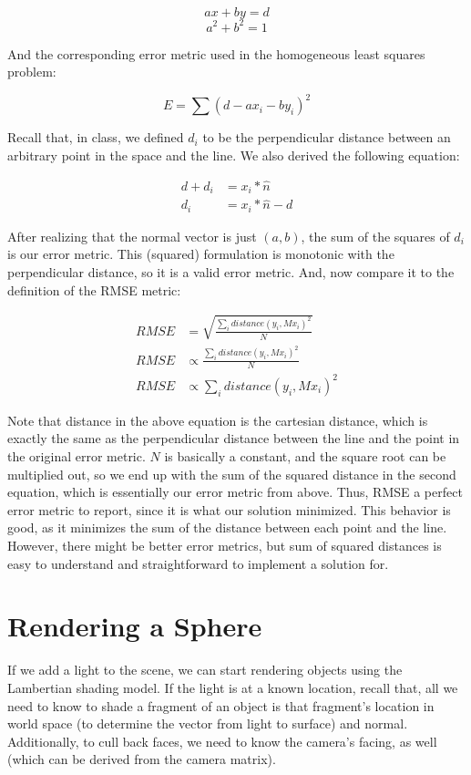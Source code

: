 \documentclass{article}
\begin{document}
$$
a x + b y = d
$$
$$
a^2 + b^2 = 1
$$
 
And the corresponding error metric used in the homogeneous least squares problem:

$$
E = \sum (d - a x_i - b y_i)^2
$$

Recall that, in class, we defined $d_i$ to be the perpendicular distance between 
an arbitrary point in the space and the line. We also derived the following equation: 

\begin{align}
d + d_i &= x_i * \hat{n} \\
d_i &= x_i * \hat{n} - d
\end{align}

After realizing that the normal vector is just $(a, b)$, the sum of the squares 
of $d_i$ is our error metric. This (squared) formulation is monotonic with the 
perpendicular distance, so it is a valid error metric. And, now compare it to 
the definition of the RMSE metric:

\begin{align}
RMSE &= \sqrt{\frac{\sum_i distance(y_i, M x_i)^2}{N}} \\
RMSE &\propto \frac{\sum_i distance(y_i, M x_i)^2}{N} \\
RMSE &\propto \sum_i distance(y_i, M x_i)^2
\end{align}

Note that distance in the above equation is the cartesian distance, which is 
exactly the same as the perpendicular distance between the line and the point 
in the original error metric. $N$ is basically a constant, and the square root 
can be multiplied out, so we end up with the sum of the squared distance in 
the second equation, which is essentially our error metric from above. Thus, 
RMSE a perfect error metric to report, since it is what our solution minimized. 
This behavior is good, as it minimizes the sum of the distance between each 
point and the line. However, there might be better error metrics, but sum of 
squared distances is easy to understand and straightforward to implement a 
solution for.

\section{Rendering a Sphere}

If we add a light to the scene, we can start rendering objects using the 
Lambertian shading model. If the light is at a known location, recall that, all 
we need to know to shade a fragment of an object is that fragment's location in world space (to determine 
the vector from light to surface) and normal. Additionally, to cull 
back faces, we need to know the camera's facing, as well (which can be derived 
from the camera matrix).
\end{document}
